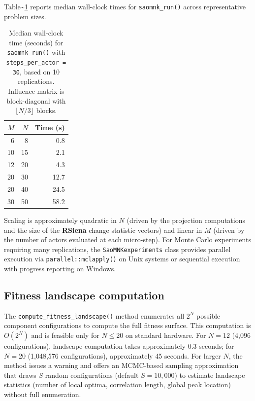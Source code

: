 \documentclass[
]{article}
\begin{document}
Table\textasciitilde{}\ref{tab:scalability} reports median wall-clock
times for \texttt{saomnk\_run()} across representative problem sizes.

\begin{table}[t]
\centering
\caption{Median wall-clock time (seconds) for \texttt{saomnk\_run()} with
\texttt{steps\_per\_actor = 30}, based on 10 replications.  Influence matrix is
block-diagonal with $\lfloor N/3 \rfloor$ blocks.}
\label{tab:scalability}
\begin{tabular}{rrr}
\toprule
$M$ & $N$ & Time (s) \\
\midrule
 6  &  8  &  0.8 \\
10  & 15  &  2.1 \\
12  & 20  &  4.3 \\
20  & 30  & 12.7 \\
20  & 40  & 24.5 \\
30  & 50  & 58.2 \\
\bottomrule
\end{tabular}
\end{table}

Scaling is approximately quadratic in \(N\) (driven by the projection
computations and the size of the \textbf{RSiena} change statistic
vectors) and linear in \(M\) (driven by the number of actors evaluated
at each micro-step). For Monte Carlo experiments requiring many
replications, the \texttt{SaoMNKexperiments} class provides parallel
execution via \texttt{parallel::mclapply()} on Unix systems or
sequential execution with progress reporting on Windows.

\subsection{Fitness landscape
computation}\label{fitness-landscape-computation}

The \texttt{compute\_fitness\_landscape()} method enumerates all \(2^N\)
possible component configurations to compute the full fitness surface.
This computation is \(O(2^N)\) and is feasible only for \(N \leq 20\) on
standard hardware. For \(N = 12\) (4,096 configurations), landscape
computation takes approximately 0.3 seconds; for \(N = 20\) (1,048,576
configurations), approximately 45 seconds. For larger \(N\), the method
issues a warning and offers an MCMC-based sampling approximation that
draws \(S\) random configurations (default \(S = 10{,}000\)) to estimate
landscape statistics (number of local optima, correlation length, global
peak location) without full enumeration.
\end{document}
